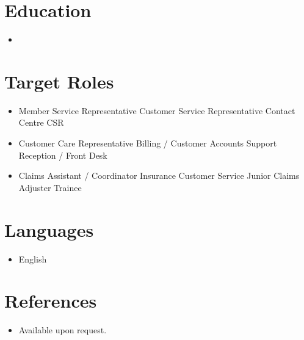\documentclass[11pt,a4paper,sans]{moderncv}
\begin{document}
\section{Education}
\vspace{1pt}
\begin{itemize}
\item{}
\end{itemize}

\section{Target Roles}
\vspace{1pt}
\begin{itemize}
\item Member Service Representative \textbullet{} Customer Service Representative \textbullet{} Contact Centre CSR
\item Customer Care Representative \textbullet{} Billing / Customer Accounts Support \textbullet{} Reception / Front Desk
\item Claims Assistant / Coordinator \textbullet{} Insurance Customer Service \textbullet{} Junior Claims Adjuster Trainee
\end{itemize}

\section{Languages}
\vspace{1pt}
\begin{itemize}
\item English
\end{itemize}

\section{References}
\vspace{1pt}
\begin{itemize}
\item{Available upon request.}
\end{itemize}
\end{document}
